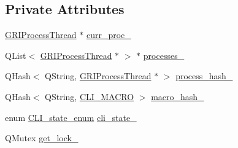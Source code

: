 \subsection*{\-Private \-Attributes}
\begin{DoxyCompactItemize}
\item 
\hyperlink{classGRIProcessThread}{\-G\-R\-I\-Process\-Thread} $\ast$ \hyperlink{classGRICLI_ab77675a0f98245725c817bd4da6366f9}{curr\-\_\-proc\-\_\-}
\item 
\-Q\-List$<$ \hyperlink{classGRIProcessThread}{\-G\-R\-I\-Process\-Thread} $\ast$ $>$ $\ast$ \hyperlink{classGRICLI_aec943cc82eb1af73f5e07100ade7407a}{processes\-\_\-}
\item 
\-Q\-Hash$<$ \-Q\-String, \*
\hyperlink{classGRIProcessThread}{\-G\-R\-I\-Process\-Thread} $\ast$ $>$ \hyperlink{classGRICLI_a4ff8ac76c1ca18864685470f08f11726}{process\-\_\-hash\-\_\-}
\item 
\-Q\-Hash$<$ \-Q\-String, \hyperlink{GRICLI_8h_abbe5cb9bb48ca20e4d52dd3ff38adac2}{\-C\-L\-I\-\_\-\-M\-A\-C\-R\-O} $>$ \hyperlink{classGRICLI_af629f086e578ea27198081ee007aa98f}{macro\-\_\-hash\-\_\-}
\item 
enum \hyperlink{GRICLI_8h_addcf807c2f309460d6a4a863aeef1da4}{\-C\-L\-I\-\_\-state\-\_\-enum} \hyperlink{classGRICLI_acec2fb69c8c83f03d286aaf13c8de52a}{cli\-\_\-state\-\_\-}
\item 
\-Q\-Mutex \hyperlink{classGRICLI_aa32c9c2ff84d0edb0ba2f4390f4de1d3}{get\-\_\-lock\-\_\-}
\end{DoxyCompactItemize}


